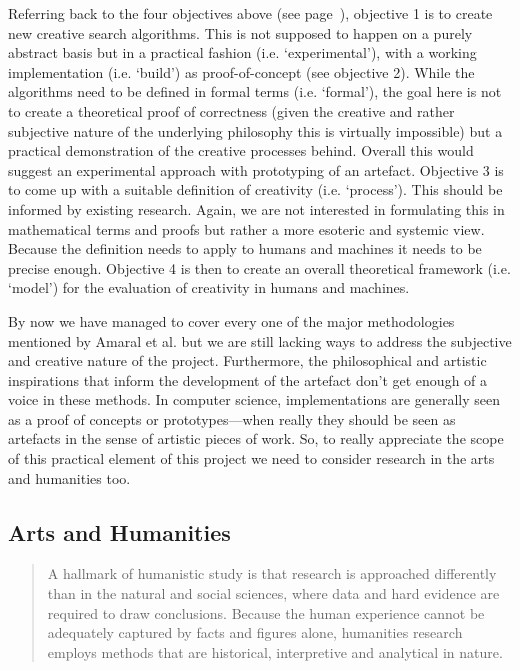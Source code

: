 Referring back to the four objectives above (see page~\pageref{s:objectives}), objective 1 is to create new creative search algorithms. This is not supposed to happen on a purely abstract basis but in a practical fashion (i.e. `experimental'), with a working implementation (i.e. `build') as proof-of-concept (see objective 2). While the algorithms need to be defined in formal terms (i.e. `formal'), the goal here is not to create a theoretical proof of correctness (given the creative and rather subjective nature of the underlying philosophy this is virtually impossible) but a practical demonstration of the creative processes behind. Overall this would suggest an experimental approach with prototyping of an artefact. Objective \num{3} is to come up with a suitable definition of creativity (i.e. `process'). This should be informed by existing research. Again, we are not interested in formulating this in mathematical terms and proofs but rather a more esoteric and systemic view. Because the definition needs to apply to humans and machines it needs to be precise enough. Objective \num{4} is then to create an overall theoretical framework (i.e. `model') for the evaluation of creativity in humans and machines.

By now we have managed to cover every one of the major methodologies mentioned by Amaral et al. \autocite*{Amaral2006} but we are still lacking ways to address the subjective and creative nature of the project. Furthermore, the philosophical and artistic inspirations that inform the development of the artefact don't get enough of a voice in these methods. In computer science, implementations are generally seen as a proof of concepts or prototypes---when really they should be seen as artefacts in the sense of artistic pieces of work. So, to really appreciate the scope of this practical element of this project we need to consider research in the arts and humanities too.


\subsection{Arts and Humanities}


\begin{quotation}
  A hallmark of humanistic study is that research is approached differently than in the natural and social sciences, where data and hard evidence are required to draw conclusions. Because the human experience cannot be adequately captured by facts and figures alone, humanities research employs methods that are historical, interpretive and analytical in nature. 
\end{quotation}

